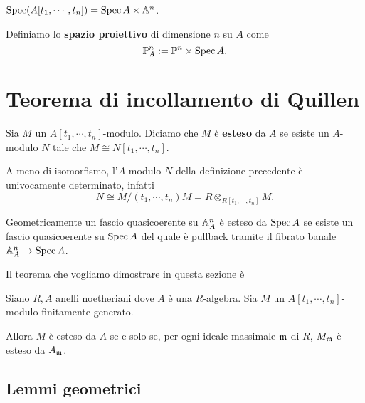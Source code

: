 \begin{remark}
$\operatorname{Spec}(A[t_1,\cdots, t_n])=\operatorname{Spec} A\times \mathbb{A}^n$.
\end{remark}

\begin{definition}
Definiamo lo \textbf{spazio proiettivo} di dimensione $n$ su $A$ come
\[\mathbb{P}^n_A:=\mathbb{P}^n\times \operatorname{Spec} A.\]
\end{definition}


\section{Teorema di incollamento di Quillen}

\begin{definition}
Sia $M$ un $A[t_1,\cdots,t_n]$-modulo. Diciamo che $M$ è \textbf{esteso} da $A$ se esiste un $A$-modulo $N$ tale che $M\cong N[t_1,\cdots,t_n]$.
\end{definition}

\begin{remark}
A meno di isomorfismo, l'$A$-modulo $N$ della definizione precedente è univocamente determinato, infatti 
\[N\cong M/(t_1,\cdots,t_n)M=R\otimes_{R[t_1,\cdots,t_n]}M.\]
\end{remark}

\begin{remark}
Geometricamente un fascio quasicoerente su $\mathbb{A}^n_A$ \`e esteso da $\operatorname{Spec} A$ se esiste un fascio quasicoerente su $\operatorname{Spec} A$ del quale \`e pullback tramite il fibrato banale $\mathbb{A}^n_A\to \operatorname{Spec} A$.
\end{remark}

Il teorema che vogliamo dimostrare in questa sezione \`e

\begin{theorem}
Siano $R,A$ anelli noetheriani dove $A$ è una $R$-algebra. Sia $M$ un $A[t_1,\cdots,t_n]$-modulo finitamente generato. 

Allora $M$ è esteso da $A$ se e solo se, per ogni ideale massimale $\mathfrak{m}$ di $R$, $M_{\mathfrak{m}}$ è esteso da $A_{\mathfrak{m}}$.
\end{theorem}




\subsection{Lemmi geometrici}

